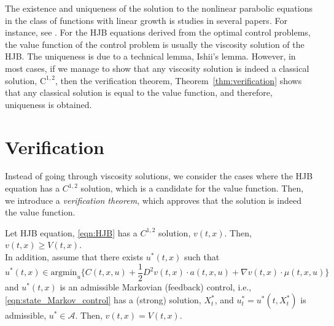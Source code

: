 \documentclass[11pt]{book}
\begin{document}
The existence and uniqueness of the solution to the nonlinear parabolic equations in the class of functions with linear growth is studies in several papers. For instance, see \cite{CIL92}. For the HJB equations derived from the optimal control problems, the value function of the control problem is usually the viscosity solution of the HJB. The uniqueness is due to a technical lemma, Ishii's lemma. However, in most cases, if we manage to show that any viscosity solution is indeed a classical solution, $\mathrm{C}^{1,2}$, then the verification theorem, Theorem~\ref{thm:verification} shows that any classical solution is equal to the value function, and therefore, uniqueness is obtained.



\section{Verification}\label{sec:verification}
Instead of going through viscosity solutions, we consider the cases where the HJB equation has a $C^{1,2}$ solution, which is a candidate for the value function. Then, we introduce a \emph{verification theorem}, which approves that the solution is indeed the value function.
\begin{thm}[Verification]\label{thm:verification}
    Let HJB equation, \eqref{eqn:HJB} has a $C^{1,2}$ solution, $v(t,x)$. Then, $v(t,x)\ge V(t,x)$.\\
In addition, assume that there exists $u^*(t,x)$ such that 
\begin{equation}
        u^*(t,x)\in\textrm{argmin}_{u}\Big\{C(t,x,u) +
         \frac12 D^2v(t,x) \cdot a(t,x,u) + \nabla v(t,x)\cdot \mu(t,x,u)\Big\}
\end{equation}
and $u^*(t,x)$ is an admissible Markovian (feedback) control, i.e., \eqref{eqn:state_Markov_control} has a (strong) solution, $X^*_t$, and $u^*_t=u^*(t, X^*_t)$ is admissible, $u^*\in\mathcal{A}$. Then, $v(t,x)=V(t,x)$.
\end{thm}
\end{document}
